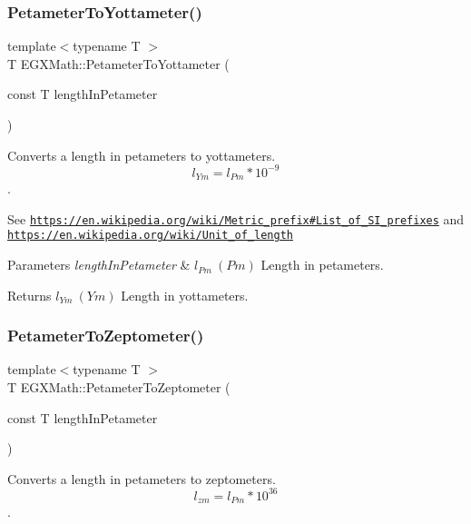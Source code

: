 \subsubsection{\texorpdfstring{Petameter\+To\+Yottameter()}{PetameterToYottameter()}}
{\footnotesize\ttfamily template$<$typename T $>$ \\
T E\+G\+X\+Math\+::\+Petameter\+To\+Yottameter (\begin{DoxyParamCaption}\item[{const T}]{length\+In\+Petameter }\end{DoxyParamCaption})}



Converts a length in petameters to yottameters. \[ l_{Ym}=l_{Pm} * 10^{-9} \]. 

See \href{https://en.wikipedia.org/wiki/Metric_prefix#List_of_SI_prefixes}{\tt https\+://en.\+wikipedia.\+org/wiki/\+Metric\+\_\+prefix\#\+List\+\_\+of\+\_\+\+S\+I\+\_\+prefixes} and \href{https://en.wikipedia.org/wiki/Unit_of_length}{\tt https\+://en.\+wikipedia.\+org/wiki/\+Unit\+\_\+of\+\_\+length} 
\begin{DoxyParams}{Parameters}
{\em length\+In\+Petameter} & $ l_{Pm}\ (Pm)$ Length in petameters. \\
\hline
\end{DoxyParams}
\begin{DoxyReturn}{Returns}
$ l_{Ym}\ (Ym)$ Length in yottameters. 
\end{DoxyReturn}
\mbox{\label{group___e_g_x_math-_conversions-_length_conversions-_petameter-_s_i_ga8c7a1ddfa7557e65e26e65e17a9e3a45}} 
\subsubsection{\texorpdfstring{Petameter\+To\+Zeptometer()}{PetameterToZeptometer()}}
{\footnotesize\ttfamily template$<$typename T $>$ \\
T E\+G\+X\+Math\+::\+Petameter\+To\+Zeptometer (\begin{DoxyParamCaption}\item[{const T}]{length\+In\+Petameter }\end{DoxyParamCaption})}



Converts a length in petameters to zeptometers. \[ l_{zm}=l_{Pm} * 10^{36} \]. 

